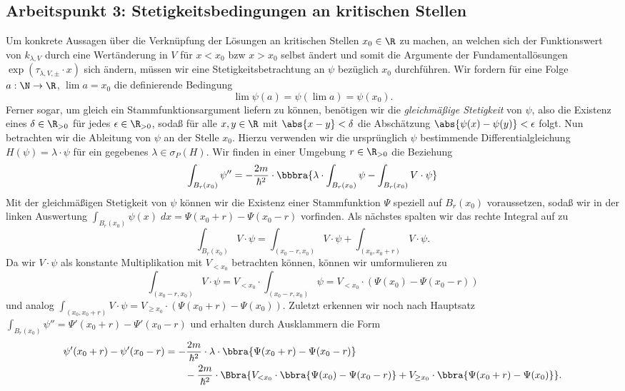 \documentclass{subfiles}
\begin{document}
    \subsection{Arbeitspunkt 3: Stetigkeitsbedingungen an kritischen Stellen}
        Um konkrete Aussagen über die Verknüpfung der Lösungen an kritischen Stellen $x_0\in\R$ zu machen, an welchen sich der Funktionswert von $k_{\lambda,V}$ durch eine Wertänderung in $V$ für $x<x_0$ bzw $x>x_0$ selbst ändert und somit die Argumente der Fundamentallösungen $\exp(\tau_{\lambda,V,\pm}\cdot x)$ sich ändern, müssen wir eine Stetigkeitsbetrachtung an $\psi$ bezüglich $x_0$ durchführen. Wir fordern für eine Folge $a:\N\to\R$, $\lim a = x_0$ die definierende Bedingung
        \[
            \lim \psi(a) = \psi(\lim a) = \psi(x_0). 
        \] 
        Ferner sogar, um gleich ein Stammfunktionsargument liefern zu können, benötigen wir die \emph{gleichmäßige Stetigkeit} von $\psi$, also die Existenz eines $\delta\in\R_{>0}$ für jedes $\epsilon\in\R_{>0}$, sodaß für alle $x,y\in\R$ mit $\abs{x-y}<\delta$ die Abschätzung $\abs{\psi(x)-\psi(y)}<\epsilon$ folgt. 
        Nun betrachten wir die Ableitung von $\psi$ an der Stelle $x_0$. Hierzu verwenden wir die ursprünglich $\psi$ bestimmende Differentialgleichung $H(\psi) = \lambda\cdot\psi$ für ein gegebenes $\lambda\in\sigma_P(H)$. Wir finden in einer Umgebung $r\in\R_{>0}$ die Beziehung
        \[
            \int_{B_r(x_0)}\psi'' = -\frac{2m}{\hbar^2}\cdot \bbbra{
                \lambda\cdot\int_{B_r(x_0)}\psi - \int_{B_r(x_0)}V\cdot\psi
            }
        \] 
        Mit der gleichmäßigen Stetigkeit von $\psi$ können wir die Existenz einer Stammfunktion $\Psi$ speziell auf $B_r(x_0)$ voraussetzen, sodaß wir in der linken Auswertung $\int_{B_r(x_0)}\psi(x)\; dx = \Psi(x_0 + r) - \Psi(x_0 - r)$ vorfinden. Als nächstes spalten wir das rechte Integral auf zu 
        \[
            \int_{B_r(x_0)}V\cdot\psi = \int_{(x_0-r,x_0)}V\cdot\psi + \int_{(x_0,x_0 + r)}V\cdot\psi.
        \]
        Da wir $V\cdot\psi$ als konstante Multiplikation mit $V_{<x_0}$ betrachten können, können wir umformulieren zu 
        \[
            \int_{(x_0-r,x_0)}V\cdot\psi = V_{<x_0}\cdot\int_{(x_0-r,x_0)}\psi = V_{<x_0}\cdot(\Psi(x_0) - \Psi(x_0 - r))
        \]
        und analog $\int_{(x_0,x_0 + r)}V\cdot\psi = V_{\geq x_0}\cdot(\Psi(x_0 + r) - \Psi(x_0))$. Zuletzt erkennen wir noch nach Hauptsatz $\int_{B_r(x_0)}\psi'' = \Psi'(x_0 + r) - \Psi'(x_0 - r)$ und erhalten durch Ausklammern die Form
        \begin{align*}
            \psi'(x_0 + r) - \psi'(x_0-r) &= -\frac{2m}{\hbar^2}\cdot\lambda\cdot\bbra{\Psi(x_0 + r) - \Psi(x_0 - r)} \\
            &\qquad - \frac{2m}{\hbar^2}\cdot\Bbra{
                V_{<x_0}\cdot\bbra{\Psi(x_0) - \Psi(x_0 - r)} + V_{\geq x_0}\cdot\bbra{\Psi(x_0 + r) - \Psi(x_0)}
            }.
        \end{align*}
\end{document}
